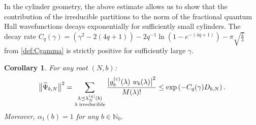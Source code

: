 \documentclass[letterpaper, DIV=17]{scrartcl}
\newtheorem{cor}[theorem]{Corollary}
\numberwithin{equation}{section}
\theoremstyle{definition}
\newcommand{\irr}{\small \textrm{irreducible}}
\begin{document}
In the cylinder geometry, the above estimate allows us to show that the contribution of the irreducible partitions to the norm of the fractional quantum Hall wavefunctions decays exponentially for sufficiently small cylinders. The decay rate 
$
C_q(\gamma)  = (\gamma^2 - 2(4q+1)) -2   q^{-1} \ln  (1- e^{-(4q+1)} )  -  \pi \sqrt{\frac{2}{3}}
$ from \eqref{def:Cgamma}
 is strictly positive for sufficiently large $ \gamma $. 
\begin{cor}
	For any root $ (N,b) $:
	\begin{equation}\label{eq:normirrep}
		\big\| \widehat \Psi_{b,N} \big\|^2   = \sum_{\substack{ \lambda \preceq \lambda_N^{(q)}(b)  \\ \lambda \; \irr }} \frac{\big| g_b^{(c)}(\lambda) \ w_b(\lambda) \big|^2}{M(\lambda)!} \leq \exp\left( - C_q(\gamma) D_{b,N}  \right) .
	\end{equation}
	Moreover,  $ \alpha_1(b) = 1 $ for any $ b \in \mathbb{N}_0 $. 
\end{cor} 
\end{document}
